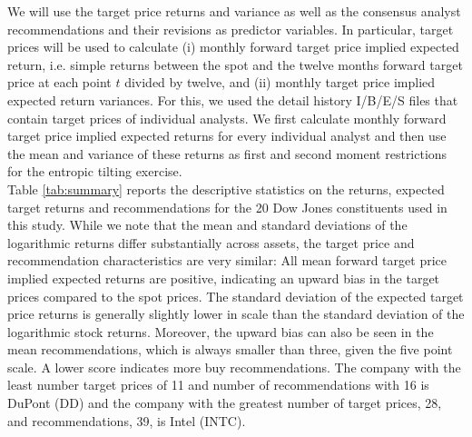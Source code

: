 We will use the target price returns and variance as well as the consensus analyst recommendations and their revisions as predictor variables. In particular, target prices will be used to calculate (i) monthly forward target price implied expected return, i.e. simple returns between the spot and the twelve months forward target price at each point $t$ divided by twelve, and (ii) monthly target price implied expected return variances. For this, we used the detail history I/B/E/S files that contain target prices of individual analysts. We first calculate monthly forward target price implied expected returns for every individual analyst and then use the mean and variance of these returns as first and second moment restrictions for the entropic tilting exercise.\\
%
\indent Table \ref{tab:summary} reports the descriptive statistics on the returns, expected target returns and recommendations for the 20 Dow Jones constituents used in this study. While we note that the mean and standard deviations of the logarithmic returns differ substantially across assets, the target price and recommendation characteristics are very similar: All mean forward target price implied expected returns are positive, indicating an upward bias in the target prices compared to the spot prices. The standard deviation of the expected target price returns is generally slightly lower in scale than the standard deviation of the logarithmic stock returns. Moreover, the upward bias can also be seen in the mean recommendations, which is always smaller than three, given the five point scale. A lower score indicates more buy recommendations. The company with the least number target prices of 11 and number of recommendations with 16 is DuPont (DD) and the company with the greatest number of target prices, 28, and recommendations, 39, is Intel (INTC). 

